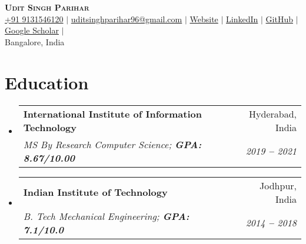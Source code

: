 \documentclass[letterpaper,11pt]{article}
\makeatletter
\newcommand{\resumeSubheading}[4]{
	\vspace{-2pt}\item
		\begin{tabular*}{0.97\textwidth}[t]{l@{\extracolsep{\fill}}r}
			\textbf{#1} & #2 \\
			\textit{\small#3} & \textit{\small #4} \\
		\end{tabular*}\vspace{-7pt}
}
\newcommand{\resumeEducationHeading}[4]{
	\vspace{-2pt}\item
		\begin{tabular*}{0.97\textwidth}[t]{l@{\extracolsep{\fill}}r}
			\textbf{#1} & #2 \\
			\textit{\small#3} & \textit{\small #4} \\
		\end{tabular*}\vspace{-5pt}
}
\newcommand{\resumeSubHeadingListStart}{\begin{itemize}[leftmargin=0.15in, label={}]}
\newcommand{\resumeSubHeadingListEnd}{\end{itemize}}
\makeatother
\begin{document}

\begin{center}
		\textbf{\Huge \scshape Udit Singh Parihar} \\ \vspace{3pt}
		\small
		\faMobile \hspace{.5pt} \href{tel:919131546120}{+91 9131546120}
		$|$
		\href{mailto:uditsinghparihar96@gmail.com}{\color{blue}\faAt \hspace{.5pt} uditsinghparihar96@gmail.com}
		$|$
		\href{https://udit.netlify.app/}{\color{blue}\faGlobe \hspace{.5pt} Website}
		$|$
		\href{https://www.linkedin.com/in/udit-singh-parihar-0bab24b7/}{\color{blue}\faLinkedinSquare \hspace{.5pt} LinkedIn}
		$|$
		\href{https://github.com/UditSinghParihar}{\color{blue}\faGithub \hspace{.5pt} GitHub}
		$|$
		\href{https://scholar.google.co.in/citations?user=fUeIp1EAAAAJ&hl=en}{\color{blue}\faGraduationCap \hspace{.5pt} Google Scholar}
		$|$\\
		\faMapMarker \hspace{.5pt} {Bangalore, India}
\end{center}




\section{Education}
	\vspace{3pt}
	\resumeSubHeadingListStart
		
		\resumeEducationHeading
			{International Institute of Information Technology}
			{Hyderabad, India}
			{MS By Research Computer Science;   \textbf{GPA: 8.67/10.00}}{2019 \textbf{--} 2021}
		
		\resumeSubheading
			{Indian Institute of Technology}
			{ Jodhpur, India}
			{B. Tech Mechanical Engineering;   \textbf{GPA: 7.1/10.0}}{2014 \textbf{--} 2018}
		
	\resumeSubHeadingListEnd



\end{document}
